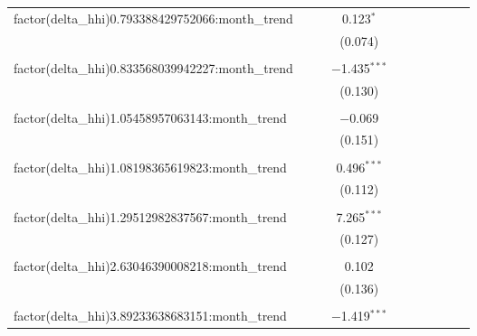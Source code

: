 \begin{table}[H]
{\begin{tabular}{@{\extracolsep{5pt}}lccccccccc}
  factor(delta\_hhi)0.793388429752066:month\_trend &  &  & 0.123$^{*}$ &  &  &  &  &  &  \\  

   &  &  & (0.074) &  &  &  &  &  &  \\  

   & & & & & & & & & \\  

  factor(delta\_hhi)0.833568039942227:month\_trend &  &  & $-$1.435$^{***}$ &  &  &  &  &  &  \\  

   &  &  & (0.130) &  &  &  &  &  &  \\  

   & & & & & & & & & \\  

  factor(delta\_hhi)1.05458957063143:month\_trend &  &  & $-$0.069 &  &  &  &  &  &  \\  

   &  &  & (0.151) &  &  &  &  &  &  \\  

   & & & & & & & & & \\  

  factor(delta\_hhi)1.08198365619823:month\_trend &  &  & 0.496$^{***}$ &  &  &  &  &  &  \\  

   &  &  & (0.112) &  &  &  &  &  &  \\  

   & & & & & & & & & \\  

  factor(delta\_hhi)1.29512982837567:month\_trend &  &  & 7.265$^{***}$ &  &  &  &  &  &  \\  

   &  &  & (0.127) &  &  &  &  &  &  \\  

   & & & & & & & & & \\  

  factor(delta\_hhi)2.63046390008218:month\_trend &  &  & 0.102 &  &  &  &  &  &  \\  

   &  &  & (0.136) &  &  &  &  &  &  \\  

   & & & & & & & & & \\  

  factor(delta\_hhi)3.89233638683151:month\_trend &  &  & $-$1.419$^{***}$ &  &  &  &  &  &  \\  


\end{tabular}}
\end{table}
